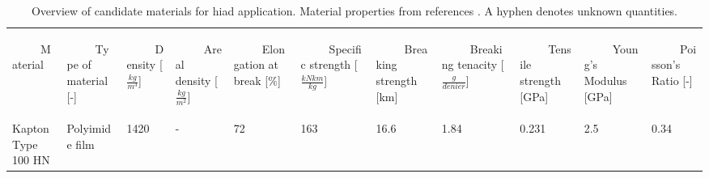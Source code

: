 \begin{table}[H]
\caption{Overview of candidate materials for \gls{hiad} application. Material properties from references \cite{Samareh2011,Miller2014}. A hyphen denotes unknown quantities.}
\vspace{41mm}
\hspace{-15mm}
\begin{tabular}{p{}|p{}|p{}|p{}|p{}|p{}|p{}|p{}|p{}|p{}|p{}|}
\begin{rotate}{60} ~~~~~Material \end{rotate}  &  \begin{rotate}{60} ~~~~~Type of material {[}-{]}  \end{rotate} & \begin{rotate}{60} ~~~~~Density [$\frac{kg}{m^3}$] \end{rotate}& \begin{rotate}{60} ~~~~~Areal density [$\frac{kg}{m^2}$] \end{rotate} & \begin{rotate}{60} ~~~~~Elongation at break [$\%$] \end{rotate} & \begin{rotate}{60} ~~~~~Specific strength [$\frac{kN km}{kg}$]\end{rotate} &  \begin{rotate}{60} ~~~~~Breaking strength [km]\end{rotate} & \begin{rotate}{60} ~~~~~Breaking tenacity [$\frac{g}{denier}$]\end{rotate}&  \begin{rotate}{60} ~~~~~Tensile strength [GPa] \end{rotate} & \begin{rotate}{60} ~~~~~Young's Modulus [GPa] \end{rotate} & \begin{rotate}{60} ~~~~~Poisson's Ratio [-] \end{rotate} \\
Kapton Type 100 HN           & Polyimide film               & 1420                                 & -                                          & 72                           & 163                              & 16.6                       & 1.84                             & 0.231                      & 2.5                       & 0.34                 \\ \hline

\end{tabular}
\end{table}
